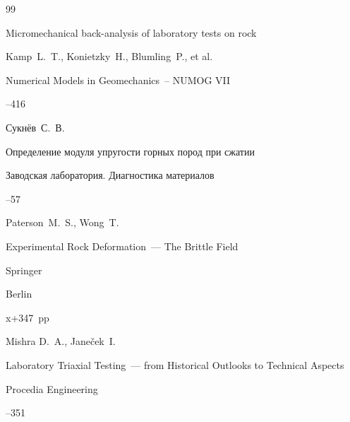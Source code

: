 \begin{thebibliography}{99}




\paper Micromechanical back-analysis of laboratory tests on rock

\by Kamp~L.~T., Konietzky~H., Blumling~P., et al.

\inbook Numerical Models in Geomechanics~-- NUMOG VII   

--416   






\by Сукнёв~С.~В.

\paper Определение модуля упругости горных пород при сжатии

\jour Заводская лаборатория. Диагностика материалов




--57







\by Paterson~M.~S., Wong~T.

\book Experimental Rock Deformation~--- The Brittle Field

\publ Springer

\publaddr Berlin


\totalpages x+347~pp \nofrills





\by Mishra D.~A.,  Jane\v{c}ek~I.

\paper  Laboratory Triaxial Testing~--- from Historical Outlooks to Technical Aspects 

\jour  Procedia Engineering



--351






\end{thebibliography}
